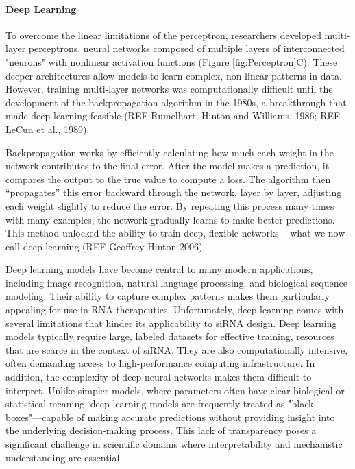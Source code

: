 \documentclass{report}
\begin{document}
\paragraph{Deep Learning}
To overcome the linear limitations of the perceptron, researchers developed multi-layer perceptrons, neural networks composed of multiple layers of interconnected "neurons" with nonlinear activation functions (Figure \ref{fig:Perceptron}C). These deeper architectures allow models to learn complex, non-linear patterns in data. However, training multi-layer networks was computationally difficult until the development of the backpropagation algorithm in the 1980s, a breakthrough that made deep learning feasible (REF Rumelhart, Hinton and Williams, 1986; REF LeCun et al., 1989).

Backpropagation works by efficiently calculating how much each weight in the network contributes to the final error. After the model makes a prediction, it compares the output to the true value to compute a loss. The algorithm then “propagates” this error backward through the network, layer by layer, adjusting each weight slightly to reduce the error. By repeating this process many times with many examples, the network gradually learns to make better predictions. This method unlocked the ability to train deep, flexible networks – what we now call deep learning (REF Geoffrey Hinton 2006).

Deep learning models have become central to many modern applications, including image recognition, natural language processing, and biological sequence modeling. Their ability to capture complex patterns makes them particularly appealing for use in RNA therapeutics. Unfortunately, deep learning comes with several limitations that hinder its applicability to siRNA design. Deep learning models typically require large, labeled datasets for effective training, resources that are scarce in the context of siRNA. They are also computationally intensive, often demanding access to high-performance computing infrastructure. In addition, the complexity of deep neural networks makes them difficult to interpret. Unlike simpler models, where parameters often have clear biological or statistical meaning, deep learning models are frequently treated as "black boxes"—capable of making accurate predictions without providing insight into the underlying decision-making process. This lack of transparency poses a significant challenge in scientific domains where interpretability and mechanistic understanding are essential.
\end{document}

